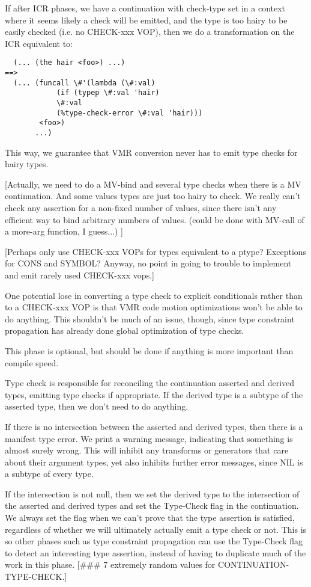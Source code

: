 If after ICR phases, we have a continuation with check-type set in a context
where it seems likely a check will be emitted, and the type is too 
hairy to be easily checked (i.e. no CHECK-xxx VOP), then we do a transformation
on the ICR equivalent to:

\begin{verbatim}
  (... (the hair <foo>) ...)
==>
  (... (funcall \#'(lambda (\#:val)
		    (if (typep \#:val 'hair)
			\#:val
			(%type-check-error \#:val 'hair)))
		<foo>)
       ...)
\end{verbatim}
This way, we guarantee that VMR conversion never has to emit type checks for
hairy types.

[Actually, we need to do a MV-bind and several type checks when there is a MV
continuation.  And some values types are just too hairy to check.  We really
can't check any assertion for a non-fixed number of values, since there isn't
any efficient way to bind arbitrary numbers of values.  (could be done with
MV-call of a more-arg function, I guess...)
]

[Perhaps only use CHECK-xxx VOPs for types equivalent to a ptype?  Exceptions
for CONS and SYMBOL?  Anyway, no point in going to trouble to implement and
emit rarely used CHECK-xxx vops.]

One potential lose in converting a type check to explicit conditionals rather
than to a CHECK-xxx VOP is that VMR code motion optimizations won't be able to
do anything.  This shouldn't be much of an issue, though, since type constraint
propagation has already done global optimization of type checks.


This phase is optional, but should be done if anything is more important than
compile speed.  

Type check is responsible for reconciling the continuation asserted and derived
types, emitting type checks if appropriate.  If the derived type is a subtype
of the asserted type, then we don't need to do anything.

If there is no intersection between the asserted and derived types, then there
is a manifest type error.  We print a warning message, indicating that
something is almost surely wrong.  This will inhibit any transforms or
generators that care about their argument types, yet also inhibits further
error messages, since NIL is a subtype of every type.

If the intersection is not null, then we set the derived type to the
intersection of the asserted and derived types and set the Type-Check flag in
the continuation.  We always set the flag when we can't prove that the type
assertion is satisfied, regardless of whether we will ultimately actually emit
a type check or not.  This is so other phases such as type constraint
propagation can use the Type-Check flag to detect an interesting type
assertion, instead of having to duplicate much of the work in this phase.  
[\#\#\# 7 extremely random values for CONTINUATION-TYPE-CHECK.]

